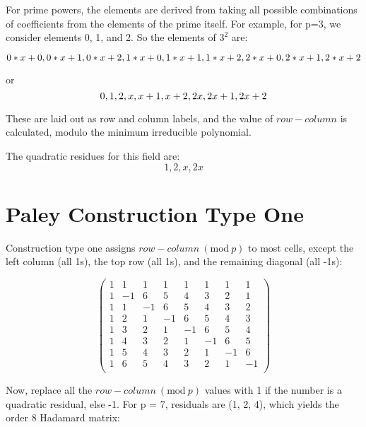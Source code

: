 \documentclass{article}
\newcommand{\Mod}[1]{\ (\mathrm{mod}\ #1)}
\begin{document}
For prime powers, the elements are derived from taking all possible combinations of
coefficients from the elements of the prime itself.  For example, for p=3, we consider
elements 0, 1, and 2.  So the elements of $3^2$ are:

\begin{equation}
0*x+0, 0*x+1, 0*x+2, 1*x+0, 1*x+1, 1*x+2, 2*x+0, 2*x+1, 2*x+2\\
\end{equation}

or
\begin{equation}
0,     1,     2,   x,     x+1,   x+2, 2x,   2x+1, 2x+2\\
\end{equation}

These are laid out as row and column labels, and the value of $row - column$
is calculated, modulo the minimum irreducible polynomial.

The quadratic residues for this field are:
\begin{equation}
    1, 2, x, 2x
\end{equation}

\section{Paley Construction Type One}

Construction type one assigns $row - column\Mod{p}$ to most cells, except the left column (all 1s),
the top row (all 1s), and the remaining diagonal (all -1s):

\begin{equation}
\begin{pmatrix}
    1 & 1 & 1 & 1 & 1 & 1 & 1 & 1  \\
    1 & -1 & 6 & 5 & 4 & 3 & 2 & 1 \\
    1 & 1 & -1 & 6 & 5 & 4 & 3 & 2 \\
    1 & 2 & 1 & -1 & 6 & 5 & 4 & 3 \\
    1 & 3 & 2 & 1 & -1 & 6 & 5 & 4 \\
    1 & 4 & 3 & 2 & 1 & -1 & 6 & 5 \\
    1 & 5 & 4 & 3 & 2 & 1 & -1 & 6 \\
    1 & 6 & 5 & 4 & 3 & 2 & 1 & -1 \\
\end{pmatrix}
\end{equation}

Now, replace all the $row - column\Mod{p}$ values with 1 if the number is a quadratic
residual, else -1.  For p = 7, residuals are (1, 2, 4), which yields the order 8 Hadamard matrix:
\end{document}

